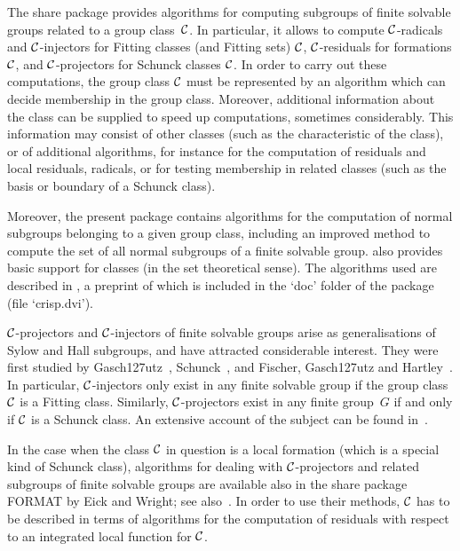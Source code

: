 
%

The share package {\CRISP} provides algorithms for computing subgroups of
finite solvable groups related to a group class~$\cal C$. In particular, it
allows to compute $\cal C$-radicals and $\cal C$-injectors for
Fitting classes (and Fitting sets) $\cal C$, $\cal C$-residuals
for formations $\cal C$, and $\cal C$-projectors for Schunck
classes $\cal C$. In order to carry out these computations, the group class
$\cal C$ must be represented by an algorithm which can decide membership in
the group class. Moreover, additional information about the class can be
supplied to speed up computations, sometimes considerably. This information
may consist of other classes (such as the characteristic of the class), or of
additional algorithms, for instance for the computation of residuals and
local residuals, radicals, or for testing membership in related classes
(such as the basis or boundary of a Schunck class).

Moreover, the present package contains algorithms for the computation of
normal subgroups belonging to a given group class, including an improved
method to compute the set of all normal subgroups of a finite solvable
group. {\CRISP} also provides basic support for classes (in
the set theoretical sense). The algorithms used are described in \cite{Hof99}, a
preprint of which is included in the `doc' folder of the package (file `crisp.dvi'). 

$\cal C$-projectors and $\cal C$-injectors of finite solvable groups
arise as generalisations of Sylow and Hall subgroups, and have attracted
considerable interest. They were first studied
by Gasch\accent127utz~\cite{Gas63}, Schunck~\cite{Sch67}, and Fischer,
Gasch\accent127utz and Hartley~\cite{FGH67}. In particular, $\cal
C$-injectors only exist in any finite solvable group if the group class
$\cal C$ is a Fitting class. Similarly, $\cal C$-projectors exist in any
finite group~$G$ if and only if $\cal C$ is a Schunck class. An extensive
account of the subject can be found in~\cite{DH92}.

In the case when the class $\cal C$ in question is a local formation (which is
a special kind of Schunck class), algorithms for dealing with $\cal
C$-projectors and related subgroups of finite solvable groups are available
also in the {\GAP} share package FORMAT  by Eick and
Wright; see also~\cite{EW99}. In order to use their methods, $\cal C$ has to
be described in terms of algorithms for the computation of residuals with
respect to an integrated local function for $\cal C$.

